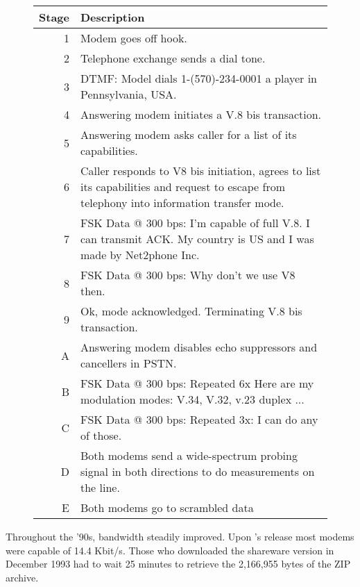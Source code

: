  \begin{figure}[H]
\centering  
\begin{tabularx}{\textwidth}{ R{0.1} L{1.9} }
  \toprule
  \textbf{Stage} &  \textbf{Description} \\
  \toprule 
   
   1 & Modem goes off hook.\\
   2 & Telephone exchange sends a dial tone.\\
   3 & DTMF: Model dials 1-(570)-234-0001 a \doom{} player in Pennsylvania, USA.\\
   4 & Answering modem initiates a V.8 bis transaction.\\
   5 & Answering modem asks caller for a list of its capabilities.\\
   6 & Caller responds to V8 bis initiation, agrees to list its capabilities and request to escape from telephony into information transfer mode.\\
   7 & FSK Data @ 300 bps: I'm capable of full V.8. I can transmit ACK. My country is US and I was made by Net2phone Inc.\\
   8 & FSK Data @ 300 bps: Why don't we use V8 then.\\
   9 & Ok, mode acknowledged. Terminating V.8 bis transaction.\\
   \toprule 
   A & Answering modem disables echo suppressors and cancellers in PSTN.\\
   B & FSK Data @ 300 bps: Repeated 6x Here are my modulation modes: V.34, V.32, v.23 duplex ...\\
   C & FSK Data @ 300 bps: Repeated 3x: I can do any of those. \\
   D & Both modems send a wide-spectrum probing signal in both directions to do measurements on the line.\\
   E & Both modems go to scrambled data \\
   \toprule
\end{tabularx}
\caption{}
\end{figure}
\par




Throughout the '90s, bandwidth steadily improved. Upon \doom{}'s release most modems were capable of 14.4 Kbit/s. Those who downloaded the shareware version in December 1993 had to wait 25 minutes to retrieve the 2,166,955 bytes of the ZIP archive.\\
\par

